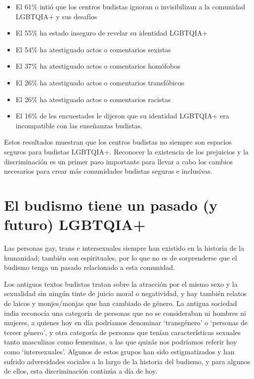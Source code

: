 \documentclass[12pt,openany]{book}
\begin{document}
\begin{itemize}
\setlength\itemsep{-0.3em}
  \item El 61\% intió que los centros budistas ignoran o invisibilizan a la comunidad LGBTQIA+ y sus desafíos
  \item El 55\% ha estado inseguro de revelar su identidad LGBTQIA+
  \item El 54\% ha atestiguado actos o comentarios sexistas
  \item El 37\% ha atestiguado actos o comentarios homófobos
  \item El 26\% ha atestiguado actos o comentarios transfóbicos
  \item El 26\% ha atestiguado actos o comentarios racistas
  \item El 16\% de les encuestades le dijeron que su identidad LGBTQIA+ era incompatible con las enseñanzas budistas.
\end{itemize}

Estos resultados muestran que los centros budistas no siempre son espacios seguros para budistas LGBTQIA+. Reconocer la existencia de los prejuicios y la discriminación es un primer paso importante para llevar a cabo los cambios necesarios para crear más comunidades budistas seguras e inclusivas.

\section*{El budismo tiene un pasado (y futuro) LGBTQIA+}

Las personas gay, trans e intersexuales siempre han existido en la historia de la humanidad; también son espirituales, por lo que no es de sorprenderse que el budismo tenga un pasado relacionado a esta comunidad.

Los antiguos textos budistas tratan sobre la atracción por el mismo sexo y la sexualidad sin ningún tinte de juicio moral o negatividad, y hay también relatos de laicos y monjes/monjas que han cambiado de género. La antigua sociedad india reconocía una categoría de personas que no se consideraban ni hombres ni mujeres, a quienes hoy en día podríamos denominar `transgénero' o `personas de tercer género', y otra categoría de personas que tenían características sexuales tanto masculinas como femeninas, a las que quizás nos podríamos referir hoy como `intersexuales'. Algunos de estos grupos han sido estigmatizados y han sufrido adversidades sociales a lo largo de la historia del budismo, y para algunos de ellos, esta discriminación continúa a día de hoy.
\end{document}
